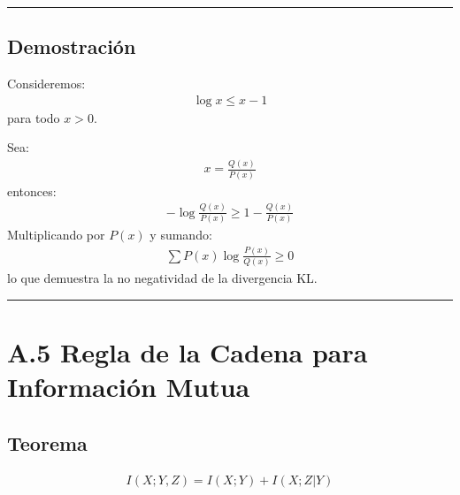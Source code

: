 \documentclass[letterpaper,10pt,english]{jupyterBook}
\begin{document}
\bigskip\hrule\bigskip



\subsection{Demostración}
\label{\detokenize{05_appendices/proofs:id6}}
\sphinxAtStartPar
Consideremos:
\begin{equation*}
\begin{split}
\log x \le x-1
\end{split}
\end{equation*}
\sphinxAtStartPar
para todo \(x>0\).

\sphinxAtStartPar
Sea:
\begin{equation*}
\begin{split}
x=\frac{Q(x)}{P(x)}
\end{split}
\end{equation*}
\sphinxAtStartPar
entonces:
\begin{equation*}
\begin{split}
-\log\frac{Q(x)}{P(x)}\ge1-\frac{Q(x)}{P(x)}
\end{split}
\end{equation*}
\sphinxAtStartPar
Multiplicando por \(P(x)\) y sumando:
\begin{equation*}
\begin{split}
\sum P(x)\log\frac{P(x)}{Q(x)}\ge0
\end{split}
\end{equation*}
\sphinxAtStartPar
lo que demuestra la no negatividad de la divergencia KL.


\bigskip\hrule\bigskip



\section{A.5 Regla de la Cadena para Información Mutua}
\label{\detokenize{05_appendices/proofs:a-5-regla-de-la-cadena-para-informacion-mutua}}

\subsection{Teorema}
\label{\detokenize{05_appendices/proofs:id7}}\begin{equation*}
\begin{split}
I(X;Y,Z)=I(X;Y)+I(X;Z|Y)
\end{split}
\end{equation*}
\end{document}

